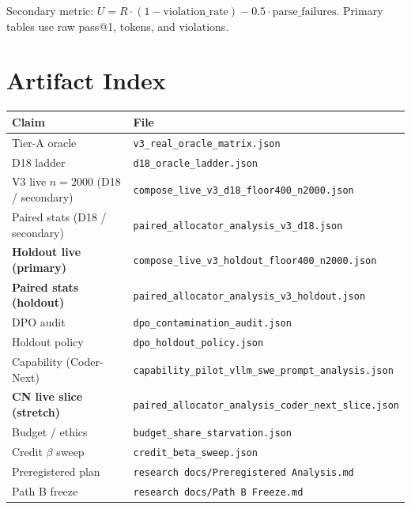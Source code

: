 \documentclass[11pt,letterpaper]{article}
\makeatletter
\newcommand{\passat}[1]{pass@#1}
\makeatother
\begin{document}
Secondary metric: $U = R \cdot (1 - \mathrm{violation\_rate}) - 0.5 \cdot \mathrm{parse\_failures}$.
Primary tables use raw \passat{1}, tokens, and violations.

\section{Artifact Index}
\label{app:artifacts}

\begin{table}[h]
\centering
\small
\begin{tabular}{ll}
\toprule
Claim & File \\
\midrule
Tier-A oracle & \texttt{v3\_real\_oracle\_matrix.json} \\
D18 ladder & \texttt{d18\_oracle\_ladder.json} \\
V3 live $n{=}2000$ (D18 / secondary) & \texttt{compose\_live\_v3\_d18\_floor400\_n2000.json} \\
Paired stats (D18 / secondary) & \texttt{paired\_allocator\_analysis\_v3\_d18.json} \\
\textbf{Holdout live (primary)} & \texttt{compose\_live\_v3\_holdout\_floor400\_n2000.json} \\
\textbf{Paired stats (holdout)} & \texttt{paired\_allocator\_analysis\_v3\_holdout.json} \\
DPO audit & \texttt{dpo\_contamination\_audit.json} \\
Holdout policy & \texttt{dpo\_holdout\_policy.json} \\
Capability (Coder-Next) & \texttt{capability\_pilot\_vllm\_swe\_prompt\_analysis.json} \\
\textbf{CN live slice (stretch)} & \texttt{paired\_allocator\_analysis\_coder\_next\_slice.json} \\
Budget / ethics & \texttt{budget\_share\_starvation.json} \\
Credit $\beta$ sweep & \texttt{credit\_beta\_sweep.json} \\
Preregistered plan & \texttt{research docs/Preregistered Analysis.md} \\
Path B freeze & \texttt{research docs/Path B Freeze.md} \\
\bottomrule
\end{tabular}
\end{table}
\end{document}
